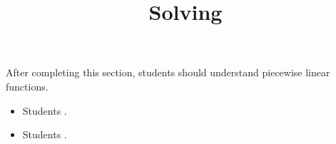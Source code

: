 \documentclass{ximera}
\title{Solving}
\begin{document}
\begin{abstract}
\end{abstract}

\maketitle

\begin{sectionOutcomes}

After completing this section, students should understand piecewise linear functions. 

\begin{itemize}
\item Students .
\item Students .
\end{itemize}

\end{sectionOutcomes}
\end{document}
